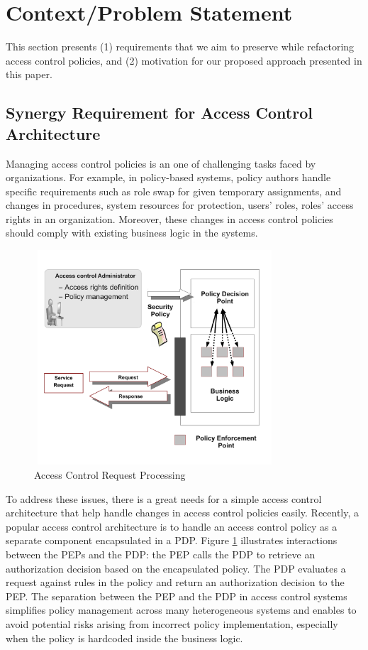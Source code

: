 



\section{Context/Problem Statement} \label{sec:context}
This section presents (1) requirements that we aim to 
preserve while refactoring access control policies, and (2) motivation for our proposed approach presented in this paper.

\subsection{Synergy Requirement for Access Control Architecture}

Managing access control policies is an one of challenging tasks faced by organizations. 
For example, in policy-based systems, policy authors handle specific 
requirements such as role swap for given temporary assignments, and changes in procedures, 
system resources for protection, users' roles, roles' access rights in an organization.
Moreover, these changes in access control policies should comply with existing business logic in the systems.

\begin{figure}[t]
\begin{center}
\includegraphics[width=9cm, height=8cm]{business-logic}
\caption{Access Control Request Processing}
\label{pep-pdp}
\end{center}
\end{figure}

To address these issues, there is a great needs for
a simple access control architecture that help handle changes in access control policies easily.
Recently, a popular access control architecture is to handle an access control policy as a separate component 
encapsulated in a PDP. Figure \ref{pep-pdp} illustrates interactions between the PEPs and the PDP: the PEP calls the PDP to 
retrieve an authorization decision based on the encapsulated policy. The PDP evaluates a request against rules in the policy
and return an authorization decision to the PEP.
The separation between the PEP and the PDP in access control systems simplifies policy management across many heterogeneous systems and enables to avoid potential risks arising from incorrect policy implementation, especially when the policy is hardcoded inside the business logic.


